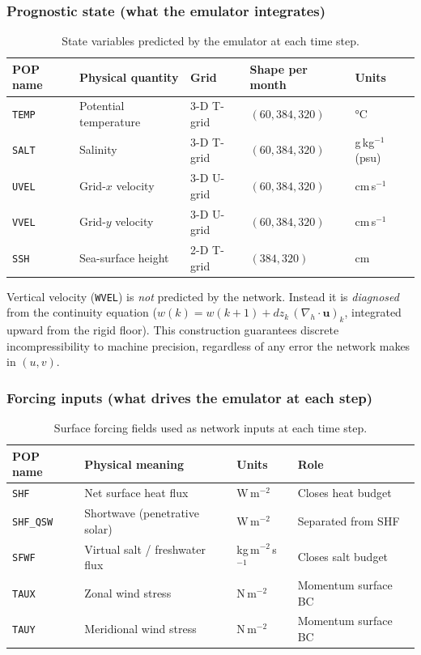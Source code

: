 \documentclass[11pt]{article}
\begin{document}
\subsubsection{Prognostic state (what the emulator integrates)}
\begin{table}[h]
\centering
\caption{State variables predicted by the emulator at each time step.}
\label{tab:statevars}
\begin{tabular}{lllll}
\toprule
POP name & Physical quantity & Grid & Shape per month & Units \\
\midrule
\texttt{TEMP} & Potential temperature & 3-D T-grid & $(60,384,320)$ & \si{\degreeCelsius} \\
\texttt{SALT} & Salinity & 3-D T-grid & $(60,384,320)$ & g\,kg$^{-1}$ (psu) \\
\texttt{UVEL} & Grid-$x$ velocity & 3-D U-grid & $(60,384,320)$ & cm\,s$^{-1}$ \\
\texttt{VVEL} & Grid-$y$ velocity & 3-D U-grid & $(60,384,320)$ & cm\,s$^{-1}$ \\
\texttt{SSH}  & Sea-surface height & 2-D T-grid & $(384,320)$ & cm \\
\bottomrule
\end{tabular}
\end{table}

Vertical velocity (\texttt{WVEL}) is \emph{not} predicted by the network.
Instead it is \emph{diagnosed} from the continuity equation
($w(k) = w(k+1) + dz_k\,(\nabla_h\cdot\mathbf{u})_k$, integrated upward from
the rigid floor). This construction guarantees discrete incompressibility to
machine precision, regardless of any error the network makes in $(u,v)$.

\subsubsection{Forcing inputs (what drives the emulator at each step)}
\begin{table}[h]
\centering
\caption{Surface forcing fields used as network inputs at each time step.}
\label{tab:forcing}
\begin{tabular}{llll}
\toprule
POP name & Physical meaning & Units & Role \\
\midrule
\texttt{SHF} & Net surface heat flux & W\,m$^{-2}$ & Closes heat budget \\
\texttt{SHF\_QSW} & Shortwave (penetrative solar) & W\,m$^{-2}$ & Separated from SHF \\
\texttt{SFWF} & Virtual salt / freshwater flux & kg\,m$^{-2}$\,s$^{-1}$ & Closes salt budget \\
\texttt{TAUX} & Zonal wind stress & N\,m$^{-2}$ & Momentum surface BC \\
\texttt{TAUY} & Meridional wind stress & N\,m$^{-2}$ & Momentum surface BC \\
\bottomrule
\end{tabular}
\end{table}
\end{document}
